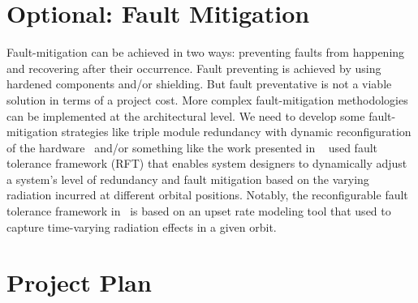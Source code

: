 %
%

\section{Optional: Fault Mitigation}
Fault-mitigation can be achieved in two ways: preventing faults from happening and
recovering after their occurrence. Fault preventing is achieved by using hardened components and/or shielding. But fault preventative is not a viable solution in terms of a project cost. More complex fault-mitigation methodologies can be implemented at the architectural level. We need to develop some fault-mitigation strategies like triple module redundancy with  dynamic reconfiguration of the hardware~\cite{jacobs2012reconfigurable} and/or something like the work presented in 
~\cite{jacobs2012reconfigurable} used fault tolerance framework (RFT) that enables system designers to dynamically adjust a system's level of redundancy and fault mitigation based on the varying radiation incurred at different orbital positions. Notably, the reconfigurable fault tolerance framework in~\cite{jacobs2012reconfigurable} is based on an upset rate modeling tool that used to capture time-varying radiation effects in a given orbit.


\section{Project Plan}


